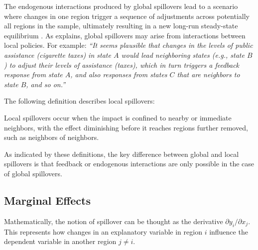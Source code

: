 \documentclass[english,12pt]{book}\usepackage[]{graphicx}\usepackage[]{xcolor}
\begin{document}
The endogenous interactions produced by global spillovers lead to a scenario where changes in one region trigger a sequence of adjustments across potentially all regions in the sample, ultimately resulting in a new long-run steady-state equilibrium \citep{lesage2014regional}. As \cite{lesage2014regional} explains, global spillovers may arise from interactions between local policies. For example: \emph{``It seems plausible that changes in the levels of public assistance (cigarette taxes) in state $A$ would lead neighboring states (e.g., state $B$) to adjust their levels of assistance (taxes), which in turn triggers a feedback response from state $A$, and also responses from states $C$ that are neighbors to state $B$, and so on.''}

The following definition describes local spillovers:

 \begin{definition}
 	Local spillovers occur when the impact is confined to nearby or immediate neighbors, with the effect diminishing before it reaches regions further removed, such as neighbors of neighbors.
 \end{definition}	

As indicated by these definitions, the key difference between global and local spillovers is that feedback or endogenous interactions are only possible in the case of global spillovers.

\subsection{Marginal Effects}

Mathematically, the notion of spillover can be thought as the derivative $\partial y_i/ \partial x_j$. This represents how changes in an explanatory variable in region $i$ influence the dependent variable in another region $j\neq i$.
\end{document}
